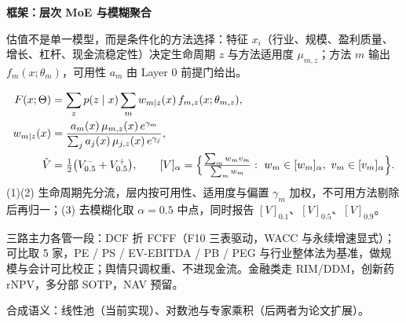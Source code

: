 \documentclass[UTF8,fontset=mac,11pt]{ctexart}
\newcommand{\hei}{\CJKfamily{pf}}
\newlength{\colw}\setlength{\colw}{388mm}
\newcommand{\sect}[2]{%
  \par\addvspace{4mm}%
  \noindent{\color{gold}\rule{\colw}{0.45mm}}\par\addvspace{2.2mm}%
  \noindent{\hei\bfseries\color{lacquer}\fontsize{39}{44}\selectfont #1}\hspace{3mm}%
  {\hei\bfseries\color{ink}\fontsize{34}{40}\selectfont #2}\par\addvspace{1.8mm}}
\newcommand{\eqbox}[1]{\par\addvspace{1.5mm}%
  \begin{tcolorbox}[enhanced, colback=creamlt, colframe=creamlt, boxrule=0mm, arc=0mm,
    left=5mm, right=5mm, top=2.2mm, bottom=2.2mm,
    borderline north={0.45mm}{0mm}{gold}, borderline south={0.45mm}{0mm}{gold}]#1\end{tcolorbox}%
  \addvspace{0.5mm}}
\begin{document}
\begin{minipage}[t]{\colw}
\sect{二、}{框架：层次 MoE 与模糊聚合}

估值不是单一模型，而是条件化的方法选择：特征 $x_i$（行业、规模、盈利质量、增长、杠杆、现金流稳定性）决定生命周期 $z$ 与方法适用度 $\mu_{m,z}$；方法 $m$ 输出 $f_m(x;\theta_m)$，可用性 $a_m$ 由 Layer 0 前提门给出。

\eqbox{%
{\fontsize{21}{26}\selectfont
\begin{align}
F(x;\Theta)&=\sum_z p(z\mid x)\sum_m w_{m\mid z}(x)\,f_{m,z}(x;\theta_{m,z}),\label{eq:moe}\\
w_{m\mid z}(x)&=\frac{a_m(x)\,\mu_{m,z}(x)\,e^{\gamma_m}}{\sum_j a_j(x)\,\mu_{j,z}(x)\,e^{\gamma_j}},\label{eq:w}\\
\hat V&=\tfrac12\bigl(V^-_{0.5}+V^+_{0.5}\bigr),\qquad
[V]_\alpha=\Bigl\{\tfrac{\sum_m w_mv_m}{\sum_m w_m}:\ w_m\in[w_m]_\alpha,\ v_m\in[v_m]_\alpha\Bigr\}.\label{eq:alpha}
\end{align}}
{\fontsize{15.5}{20}\selectfont\color{stone}(1)(2) 生命周期先分流，层内按可用性、适用度与偏置 $\gamma_m$ 加权，不可用方法剔除后再归一；(3) 去模糊化取 $\alpha=0.5$ 中点，同时报告 $[V]_{0.1}$、$[V]_{0.5}$、$[V]_{0.9}$。}\par}

三路主力各管一段：DCF 折 FCFF（F10 三表驱动，WACC 与永续增速显式）；可比取 5 家，PE / PS / EV-EBITDA / PB / PEG 与行业整体法为基准，做规模与会计可比校正；舆情只调权重、不进现金流。金融类走 RIM/DDM，创新药 rNPV，多分部 SOTP，NAV 预留。

合成语义：线性池（当前实现）、对数池与专家乘积（后两者为论文扩展）。


\end{minipage}
\end{document}

